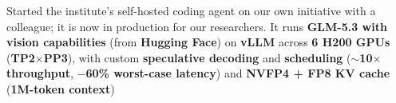 {\begin{experiences}
{\begin{itemize}
{                %
                \ifcvshowagent
                \item Started the institute's self-hosted coding agent on our own initiative with a colleague; it is now in production for our researchers. It runs \textbf{GLM-5.3 with vision capabilities}\ifcvshowstackdetail{} (from \textbf{Hugging Face})\fi{} on \textbf{vLLM} across \textbf{6 H200 GPUs}\ifcvshowservingdetail{} (\textbf{TP2$\times$PP3})\fi, with custom \textbf{speculative decoding} and \textbf{scheduling} (\textbf{$\sim$10$\times$ throughput}\ifcvshowservingdetail, \textbf{$-$60\% worst-case latency}\fi) and \textbf{NVFP4 + FP8 KV cache} (\textbf{1M-token context})
                \fi}

\end{itemize}}
\end{experiences}}
